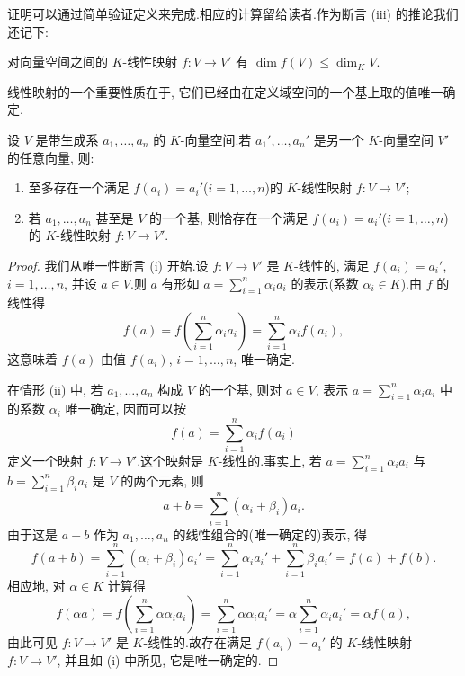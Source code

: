 证明可以通过简单验证定义来完成.相应的计算留给读者.作为断言 (iii) 的推论我们还记下:

\begin{remark}\label{rem:2.1.6}
对向量空间之间的 $K$-线性映射 $f \colon V \longrightarrow V'$ 有 $\dim f(V) \leq \dim_K V$.
\end{remark}

线性映射的一个重要性质在于, 它们已经由在定义域空间的一个基上取的值唯一确定.

\begin{theorem}[线性映射的确定]\label{thm:2.1.7}
设 $V$ 是带生成系 $a_1, \ldots, a_n$ 的 $K$-向量空间.若 $a_1', \ldots, a_n'$ 是另一个 $K$-向量空间 $V'$ 的任意向量, 则:
\begin{enumerate}
\item[(i)] 至多存在一个满足 $f(a_i) = a_i'$($i = 1, \ldots, n$)的 $K$-线性映射 $f \colon V \longrightarrow V'$;
\item[(ii)] 若 $a_1, \ldots, a_n$ 甚至是 $V$ 的一个基, 则恰存在一个满足 $f(a_i) = a_i'$($i = 1, \ldots, n$)的 $K$-线性映射 $f \colon V \longrightarrow V'$.
\end{enumerate}
\end{theorem}

\begin{proof}
我们从唯一性断言 (i) 开始.设 $f \colon V \longrightarrow V'$ 是 $K$-线性的, 满足 $f(a_i) = a_i'$, $i = 1, \ldots, n$, 并设 $a \in V$.则 $a$ 有形如 $a = \sum_{i = 1}^{n} \alpha_i a_i$ 的表示(系数 $\alpha_i \in K$).由 $f$ 的线性得
\[
f(a) = f\left(\sum_{i = 1}^{n} \alpha_i a_i\right) = \sum_{i = 1}^{n} \alpha_i f(a_i),
\]
这意味着 $f(a)$ 由值 $f(a_i)$, $i = 1, \ldots, n$, 唯一确定.

在情形 (ii) 中, 若 $a_1, \ldots, a_n$ 构成 $V$ 的一个基, 则对 $a \in V$, 表示 $a = \sum_{i = 1}^{n} \alpha_i a_i$ 中的系数 $\alpha_i$ 唯一确定, 因而可以按
\[
f(a) = \sum_{i = 1}^{n} \alpha_i f(a_i)
\]
定义一个映射 $f \colon V \longrightarrow V'$.这个映射是 $K$-线性的.事实上, 若 $a = \sum_{i = 1}^{n} \alpha_i a_i$ 与 $b = \sum_{i = 1}^{n} \beta_i a_i$ 是 $V$ 的两个元素, 则
\[
a + b = \sum_{i = 1}^{n} (\alpha_i + \beta_i) a_i\text{.}
\]
由于这是 $a + b$ 作为 $a_1, \ldots, a_n$ 的线性组合的(唯一确定的)表示, 得
\[
f(a + b) = \sum_{i = 1}^{n} (\alpha_i + \beta_i) a_i' = \sum_{i = 1}^{n} \alpha_i a_i' + \sum_{i = 1}^{n} \beta_i a_i' = f(a) + f(b)\text{.}
\]
相应地, 对 $\alpha \in K$ 计算得
\[
f(\alpha a) = f\left(\sum_{i = 1}^{n} \alpha\alpha_i a_i\right) = \sum_{i = 1}^{n} \alpha\alpha_i a_i' = \alpha \sum_{i = 1}^{n} \alpha_i a_i' = \alpha f(a),
\]
由此可见 $f \colon V \longrightarrow V'$ 是 $K$-线性的.故存在满足 $f(a_i) = a_i'$ 的 $K$-线性映射 $f \colon V \longrightarrow V'$, 并且如 (i) 中所见, 它是唯一确定的.
\end{proof}

